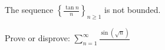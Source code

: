 \documentclass{article}
\begin{document}
\begin{problem}{}
    The sequence $\displaystyle \left\{ \frac{\tan n}{n} \right\}_{n \geq 1}$ is not bounded. 
\end{problem}

\begin{problem}{}
    Prove or disprove: $\displaystyle \sum_{n = 1}^\infty \frac{\sin (\sqrt{n})}{}$
\end{problem}
\end{document}
